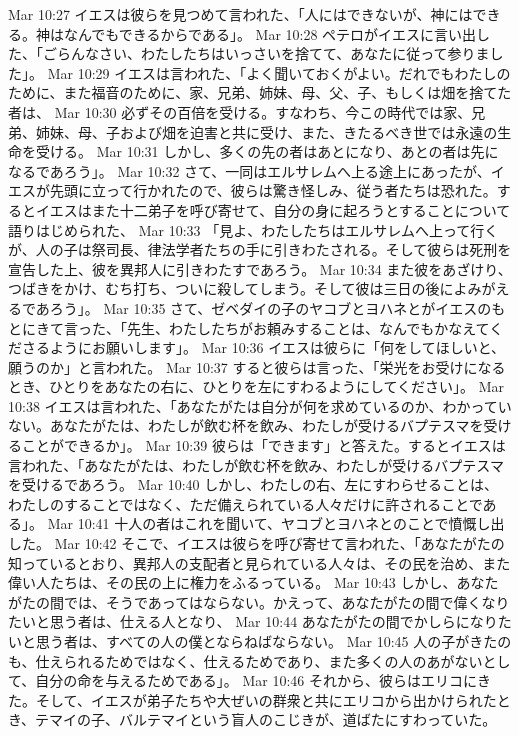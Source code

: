 Mar 10:27  イエスは彼らを見つめて言われた、「人にはできないが、神にはできる。神はなんでもできるからである」。
Mar 10:28  ペテロがイエスに言い出した、「ごらんなさい、わたしたちはいっさいを捨てて、あなたに従って参りました」。
Mar 10:29  イエスは言われた、「よく聞いておくがよい。だれでもわたしのために、また福音のために、家、兄弟、姉妹、母、父、子、もしくは畑を捨てた者は、
Mar 10:30  必ずその百倍を受ける。すなわち、今この時代では家、兄弟、姉妹、母、子および畑を迫害と共に受け、また、きたるべき世では永遠の生命を受ける。
Mar 10:31  しかし、多くの先の者はあとになり、あとの者は先になるであろう」。
Mar 10:32  さて、一同はエルサレムへ上る途上にあったが、イエスが先頭に立って行かれたので、彼らは驚き怪しみ、従う者たちは恐れた。するとイエスはまた十二弟子を呼び寄せて、自分の身に起ろうとすることについて語りはじめられた、
Mar 10:33  「見よ、わたしたちはエルサレムへ上って行くが、人の子は祭司長、律法学者たちの手に引きわたされる。そして彼らは死刑を宣告した上、彼を異邦人に引きわたすであろう。
Mar 10:34  また彼をあざけり、つばきをかけ、むち打ち、ついに殺してしまう。そして彼は三日の後によみがえるであろう」。
Mar 10:35  さて、ゼベダイの子のヤコブとヨハネとがイエスのもとにきて言った、「先生、わたしたちがお頼みすることは、なんでもかなえてくださるようにお願いします」。
Mar 10:36  イエスは彼らに「何をしてほしいと、願うのか」と言われた。
Mar 10:37  すると彼らは言った、「栄光をお受けになるとき、ひとりをあなたの右に、ひとりを左にすわるようにしてください」。
Mar 10:38  イエスは言われた、「あなたがたは自分が何を求めているのか、わかっていない。あなたがたは、わたしが飲む杯を飲み、わたしが受けるバプテスマを受けることができるか」。
Mar 10:39  彼らは「できます」と答えた。するとイエスは言われた、「あなたがたは、わたしが飲む杯を飲み、わたしが受けるバプテスマを受けるであろう。
Mar 10:40  しかし、わたしの右、左にすわらせることは、わたしのすることではなく、ただ備えられている人々だけに許されることである」。
Mar 10:41  十人の者はこれを聞いて、ヤコブとヨハネとのことで憤慨し出した。
Mar 10:42  そこで、イエスは彼らを呼び寄せて言われた、「あなたがたの知っているとおり、異邦人の支配者と見られている人々は、その民を治め、また偉い人たちは、その民の上に権力をふるっている。
Mar 10:43  しかし、あなたがたの間では、そうであってはならない。かえって、あなたがたの間で偉くなりたいと思う者は、仕える人となり、
Mar 10:44  あなたがたの間でかしらになりたいと思う者は、すべての人の僕とならねばならない。
Mar 10:45  人の子がきたのも、仕えられるためではなく、仕えるためであり、また多くの人のあがないとして、自分の命を与えるためである」。
Mar 10:46  それから、彼らはエリコにきた。そして、イエスが弟子たちや大ぜいの群衆と共にエリコから出かけられたとき、テマイの子、バルテマイという盲人のこじきが、道ばたにすわっていた。
